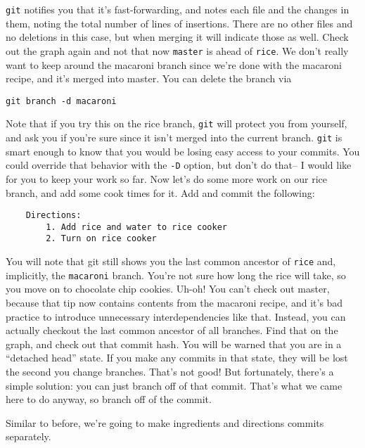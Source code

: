 \par{
\verb+git+ notifies you that it's fast-forwarding, and notes each file and the
changes in them, noting the total number of lines of insertions. There are no
other files and no deletions in this case, but when merging it will indicate
those as well. Check out the graph again and not that now \verb+master+ is
ahead of \verb+rice+. We don't really want to keep around the macaroni branch
since we're done with the macaroni recipe, and it's merged into master. You
can delete the branch via
}

\begin{verbatim}
git branch -d macaroni
\end{verbatim}

\par{
Note that if you try this on the rice branch, \verb+git+ will protect you from
yourself, and ask you if you're sure since it isn't merged into the current
branch.
\verb+git+ is smart enough to know that you would be losing easy access to
your commits.
You could override that behavior with the \verb+-D+ option, but don't do
that-- I would like for you to keep your work so far.
Now let's do some more work on our rice branch, and add some cook times for it.
Add and commit the following:
}

\begin{verbatim}
    Directions:
        1. Add rice and water to rice cooker
        2. Turn on rice cooker
\end{verbatim}

\par{
You will note that git still shows you the last common ancestor of \verb+rice+
and, implicitly, the \verb+macaroni+ branch. You're not sure how long the rice
will take, so you move on to chocolate chip cookies. Uh-oh! You can't check
out master, because that tip now contains contents from the macaroni recipe,
and it's bad practice to introduce unnecessary interdependencies like that. 
Instead, you can actually checkout the last common ancestor of all branches.
Find that on the graph, and check out that commit hash. You will be warned
that you are in a ``detached head'' state. If you make any commits in that
state, they will be lost the second you change branches. That's not good! But
fortunately, there's a simple solution: you can just branch off of that
commit. That's what we came here to do anyway, so branch off of the commit.
}

\par{Similar to before, we're going to make ingredients and directions commits
separately.}

